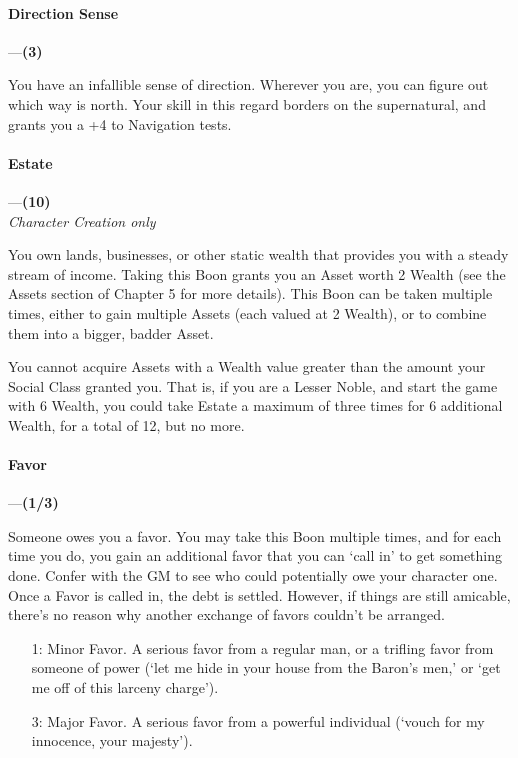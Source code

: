 \documentclass[oneside,11pt,english]{book}
\begin{document}
\paragraph{\label{boon:Direction Sense}Direction Sense}---\quad\textbf{(3)}\par
You have an infallible sense of direction. Wherever you are, you can figure out which way is north. Your skill in this regard borders on the supernatural, and grants you a +4 to Navigation tests.
\paragraph{\label{boon:Estate}Estate}---\quad\textbf{(10)}\\
\textit{Character Creation only}\par
You own lands, businesses, or other static wealth that provides you with a steady stream of income. 
Taking this Boon grants you an Asset worth 2 Wealth (see the Assets section of Chapter 5 for more 
details). This Boon can be taken multiple times, either to gain multiple Assets (each valued at 2 Wealth), 
or to combine them into a bigger, badder Asset. 

You cannot acquire Assets with a Wealth value greater than the amount your Social Class granted you. 
That is, if you are a Lesser Noble, and start the game with 6 Wealth, you could take Estate a maximum of 
three times for 6 additional Wealth, for a total of 12, but no more. 
\paragraph{\label{boon:Favor}Favor}---\quad\textbf{(1/3)}\par
Someone owes you a favor. You may take this Boon multiple times, and for each time you do, you gain 
an additional favor that you can ‘call in’ to get something done. Confer with the GM to see who could 
potentially owe your character one. Once a Favor is called in, the debt is settled. However, if things are 
still amicable, there's no reason why another exchange of favors couldn't be arranged. 
	\begin{itemize}
		\item [1:] Minor Favor. A serious favor from a regular man, or a trifling favor from someone of power (‘let me hide in your house from the Baron's men,’ or ‘get me off of this larceny charge’).
		\item [3:] Major Favor. A serious favor from a powerful individual (‘vouch for my innocence, your majesty’).
	\end{itemize}
\end{document}
